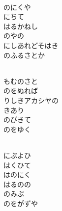 \documentclass[10pt,b5j]{tarticle} %
\begin{document}
\vspace{1.5em} %
\newcommand{\linespace}{0.5em} %
\newcommand{\blocksize}{0.5\hsize} %
\newcommand{\itemmargin}{6em} %
\begin{enumerate} %
    \setlength{\itemindent}{\itemmargin} %
    \begin{minipage}[c]{\blocksize}
    
        \vspace{\linespace}
        \item~\\
        のにくや\\
        にちて\\
        はるかねし\\
        のやの\\
        にしあれどそはき\\
        のふるさとか
        
        \vspace{\linespace}
        \item~\\
        もむのさと\\
        のをぬれば\\
        りしきアカシヤの\\
        きあり\\
        のびきて\\
        のをゆく
        
        \vspace{\linespace}
        \item~\\
        にぶよひ\\
        はくひて\\
        はのにく\\
        はるのの\\
        のみぶ\\
        のをがずや
        

\end{minipage}
\end{enumerate}
\end{document}
